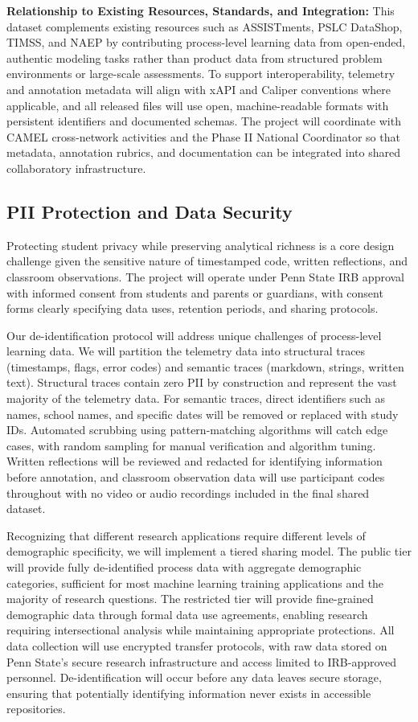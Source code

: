 \documentclass[11pt]{article}
\begin{document}
\textbf{Relationship to Existing Resources, Standards, and Integration:}
This dataset complements existing resources such as ASSISTments, PSLC DataShop, TIMSS, and NAEP by contributing process-level learning data from open-ended, authentic modeling tasks rather than product data from structured problem environments or large-scale assessments.
To support interoperability, telemetry and annotation metadata will align with xAPI and Caliper conventions where applicable, and all released files will use open, machine-readable formats with persistent identifiers and documented schemas.
The project will coordinate with CAMEL cross-network activities and the Phase II National Coordinator so that metadata, annotation rubrics, and documentation can be integrated into shared collaboratory infrastructure.

\subsection{PII Protection and Data Security}

Protecting student privacy while preserving analytical richness is a core design challenge given the sensitive nature of timestamped code, written reflections, and classroom observations.
The project will operate under Penn State IRB approval with informed consent from students and parents or guardians, with consent forms clearly specifying data uses, retention periods, and sharing protocols.

Our de-identification protocol will address unique challenges of process-level learning data.
We will partition the telemetry data into structural traces (timestamps, flags, error codes) and semantic traces (markdown, strings, written text).
Structural traces contain zero PII by construction and represent the vast majority of the telemetry data.
For semantic traces, direct identifiers such as names, school names, and specific dates will be removed or replaced with study IDs.
Automated scrubbing using pattern-matching algorithms will catch edge cases, with random sampling for manual verification and algorithm tuning.
Written reflections will be reviewed and redacted for identifying information before annotation, and classroom observation data will use participant codes throughout with no video or audio recordings included in the final shared dataset.

Recognizing that different research applications require different levels of demographic specificity, we will implement a tiered sharing model.
The public tier will provide fully de-identified process data with aggregate demographic categories, sufficient for most machine learning training applications and the majority of research questions.
The restricted tier will provide fine-grained demographic data through formal data use agreements, enabling research requiring intersectional analysis while maintaining appropriate protections.
All data collection will use encrypted transfer protocols, with raw data stored on Penn State's secure research infrastructure and access limited to IRB-approved personnel. 
De-identification will occur before any data leaves secure storage, ensuring that potentially identifying information never exists in accessible repositories.
\end{document}
